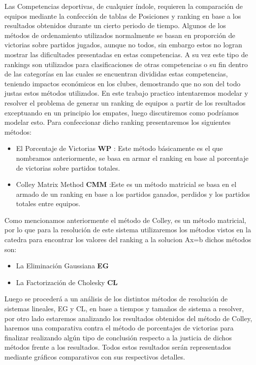 Las Competencias deportivas, de cualquier índole, requieren la comparación de equipos mediante la confección de tablas de Posiciones y ranking en base a los 
resultados obtenidos durante un cierto periodo de tiempo. Algunos de los métodos de ordenamiento utilizados normalmente se basan en proporción de victorias 
sobre partidos jugados, aunque no todos, sin embargo estos no logran mostrar las dificultades presentadas en estas competencias. A su vez este tipo de 
rankings son utilizados para clasificaciones de otras competencias o su fin dentro de las categorías en las cuales se encuentran divididas estas 
competencias, teniendo impactos económicos en los clubes, demostrando que no son del todo justas estos métodos utilizados.
En este trabajo practico intentaremos modelar y resolver el problema de generar un ranking de equipos a partir de los resultados exceptuando en un principio los empates,
luego discutiremos como podríamos modelar esto.
Para confeccionar dicho ranking presentaremos los siguientes métodos:
\begin{itemize}  
\item El Porcentaje de Victorias \textbf{WP} : Este método básicamente es el que nombramos anteriormente, se basa en armar el ranking en base al porcentaje de victorias sobre partidos totales.
\item Colley Matrix Method \textbf{CMM} :Este es un método matricial se basa en el armado de un ranking en base a los partidos ganados, perdidos y los partidos totales entre equipos.
\end{itemize}

Como mencionamos anteriormente el método de Colley, es un método matricial, por lo que para la resolución de este sistema utilizaremos los métodos vistos en
la catedra para encontrar los valores del ranking a la solucion Ax=b dichos métodos son:

\begin{itemize}  
\item La Eliminación Gaussiana \textbf{EG}
\item La Factorización de Cholesky \textbf{CL}
\end{itemize}

Luego se procederá a un análisis de los distintos métodos de resolución de sistemas lineales, EG y CL, en base a tiempos y tamaños de sistema a resolver,
por otro lado estaremos analizando los resultados obtenidos del método de Colley, haremos una comparativa contra el método de porcentajes de victorias para 
finalizar realizando algún tipo de conclusión respecto a la justicia de dichos métodos frente a los resultados. Todos estos resultados serán representados 
mediante gráficos comparativos con sus respectivos detalles.


